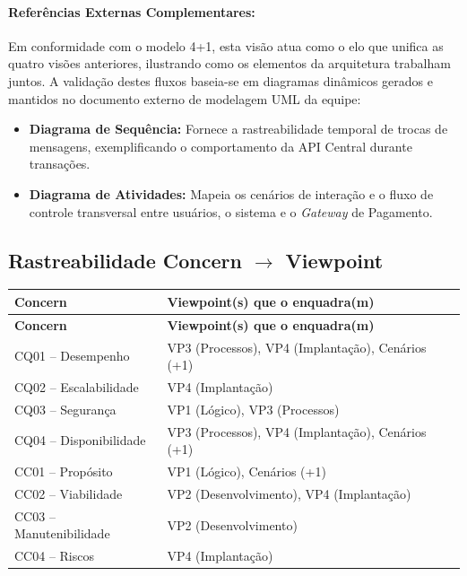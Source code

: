 ﻿\documentclass[12pt,a4paper]{article}
\begin{document}
\paragraph{Referências Externas Complementares:} Em conformidade com o modelo 4+1, esta visão atua como o elo que unifica as quatro visões anteriores, ilustrando como os elementos da arquitetura trabalham juntos. A validação destes fluxos baseia-se em diagramas dinâmicos gerados e mantidos no documento externo de modelagem UML da equipe:
\begin{itemize}[noitemsep]
    \item \textbf{Diagrama de Sequência:} Fornece a rastreabilidade temporal de trocas de mensagens, exemplificando o comportamento da API Central durante transações.
    \item \textbf{Diagrama de Atividades:} Mapeia os cenários de interação e o fluxo de controle transversal entre usuários, o sistema e o \textit{Gateway} de Pagamento.
\end{itemize}

\subsection{Rastreabilidade Concern $\rightarrow$ Viewpoint}

\begin{longtable}{|p{5cm}|p{9.5cm}|}
\hline
\textbf{Concern} & \textbf{Viewpoint(s) que o enquadra(m)} \\
\hline
\endfirsthead
\hline
\textbf{Concern} & \textbf{Viewpoint(s) que o enquadra(m)} \\
\hline
\endhead
CQ01 -- Desempenho & VP3 (Processos), VP4 (Implantação), Cenários (+1) \\
\hline
CQ02 -- Escalabilidade & VP4 (Implantação) \\
\hline
CQ03 -- Segurança & VP1 (Lógico), VP3 (Processos) \\
\hline
CQ04 -- Disponibilidade & VP3 (Processos), VP4 (Implantação), Cenários (+1) \\
\hline
CC01 -- Propósito & VP1 (Lógico), Cenários (+1) \\
\hline
CC02 -- Viabilidade & VP2 (Desenvolvimento), VP4 (Implantação) \\
\hline
CC03 -- Manutenibilidade & VP2 (Desenvolvimento) \\
\hline
CC04 -- Riscos & VP4 (Implantação) \\
\hline
\end{longtable}
\end{document}
